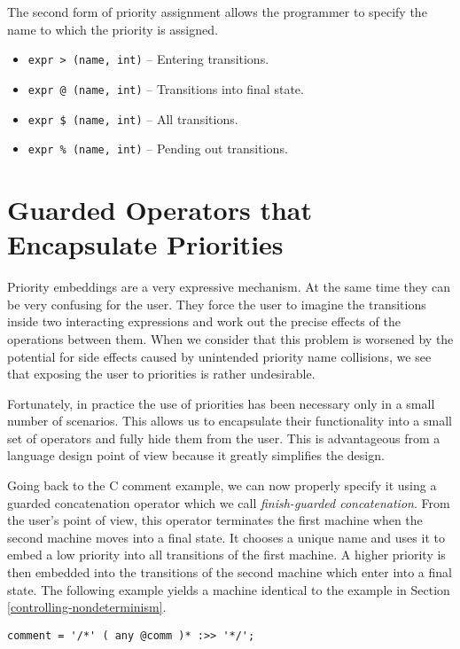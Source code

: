 \documentclass[letterpaper,11pt,oneside]{book}
\newenvironment{inline_code}{\def\baselinestretch{1}\vspace{12pt}\small}{}
\begin{document}
The second form of priority assignment allows the programmer to specify the name
to which the priority is assigned.

\begin{itemize}
\setlength{\parskip}{0in}
\item \verb|expr > (name, int)| -- Entering transitions.
\item \verb|expr @ (name, int)| -- Transitions into final state.
\item \verb|expr $ (name, int)| -- All transitions.
\item \verb|expr % (name, int)| -- Pending out transitions.
\end{itemize}

\section{Guarded Operators that Encapsulate Priorities}

Priority embeddings are a very expressive mechanism. At the same time they
can be very confusing for the user. They force the user to imagine
the transitions inside two interacting expressions and work out the precise
effects of the operations between them. When we consider
that this problem is worsened by the
potential for side effects caused by unintended priority name collisions, we
see that exposing the user to priorities is rather undesirable.

Fortunately, in practice the use of priorities has been necessary only in a
small number of scenarios.  This allows us to encapsulate their functionality
into a small set of operators and fully hide them from the user. This is
advantageous from a language design point of view because it greatly simplifies
the design.  

Going back to the C comment example, we can now properly specify
it using a guarded concatenation operator which we call {\em finish-guarded
concatenation}. From the user's point of view, this operator terminates the
first machine when the second machine moves into a final state.  It chooses a
unique name and uses it to embed a low priority into all
transitions of the first machine. A higher priority is then embedded into the
transitions of the second machine which enter into a final state. The following
example yields a machine identical to the example in Section 
\ref{controlling-nondeterminism}.

\begin{inline_code}
\begin{verbatim}
comment = '/*' ( any @comm )* :>> '*/';
\end{verbatim}
\end{inline_code}
\end{document}
